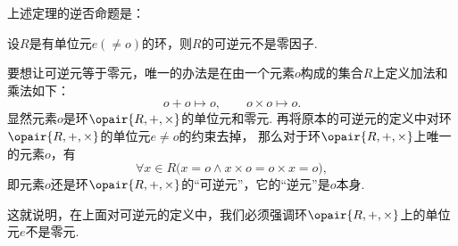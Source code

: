 上述定理的逆否命题是：
\begin{corollary}
设\(R\)是有单位元\(e(\neq o)\)的环，则\(R\)的可逆元不是零因子.
\end{corollary}

\begin{example}
要想让可逆元等于零元，唯一的办法是在由一个元素\(o\)构成的集合\(R\)上定义加法和乘法如下：\[
    o + o \mapsto o,
    \qquad
    o \times o \mapsto o.
\]
显然元素\(o\)是环\(\opair{R,+,\times}\)的单位元和零元.
再将原本的可逆元的定义中对环\(\opair{R,+,\times}\)的单位元\(e \neq o\)的约束去掉，
那么对于环\(\opair{R,+,\times}\)上唯一的元素\(o\)，有\[
    \forall x \in R \bigl( x = o \land x \times o = o \times x = o \bigr),
\]
即元素\(o\)还是环\(\opair{R,+,\times}\)的“可逆元”，它的“逆元”是\(o\)本身.

这就说明，在上面对可逆元的定义中，我们必须强调环\(\opair{R,+,\times}\)上的单位元\(e\)不是零元.
\end{example}
